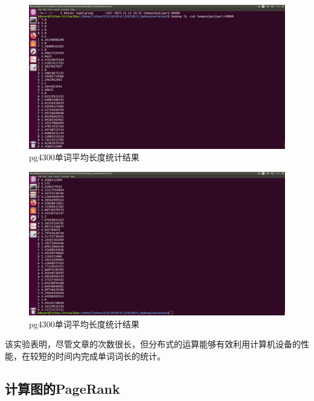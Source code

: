 \documentclass{article}
\begin{document}
\begin{figure}[htbp]
\centering
\includegraphics[width=14.5cm]{img/wc_output1.png}
\caption{pg4300单词平均长度统计结果}
\label{wcres1}
\end{figure}
\begin{figure}[htbp]
\centering
\includegraphics[width=14.5cm]{img/wc_output2.png}
\caption{pg4300单词平均长度统计结果}
\label{wcres2}
\end{figure}

该实验表明，尽管文章的次数很长，但分布式的运算能够有效利用计算机设备的性能，在较短的时间内完成单词词长的统计。

\subsection{计算图的PageRank}
\end{document}
